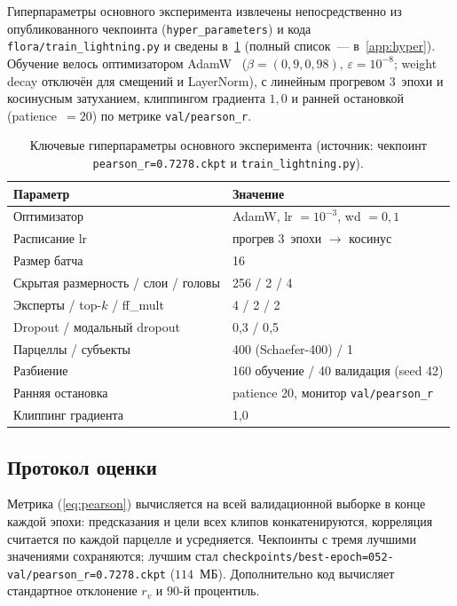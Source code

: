 \documentclass[11pt,a4paper]{article}
\begin{document}
Гиперпараметры основного эксперимента извлечены непосредственно
из опубликованного чекпоинта (\texttt{hyper\_parameters}) и кода
\texttt{flora/train\_lightning.py} и сведены в~\cref{tab:hyper}
(полный список~--- в~\cref{app:hyper}). Обучение велось
оптимизатором AdamW~\cite{Loshchilov2019} ($\beta = (0{,}9, 0{,}98)$,
$\varepsilon = 10^{-8}$; weight decay отключён для смещений и
LayerNorm), с линейным прогревом $3$~эпохи и косинусным затуханием,
клиппингом градиента $1{,}0$ и ранней остановкой (patience~$=20$)
по метрике \texttt{val/pearson\_r}.

\begin{table}[H]
\centering
\caption{Ключевые гиперпараметры основного эксперимента (источник:
чекпоинт \texttt{pearson\_r=0.7278.ckpt} и \texttt{train\_lightning.py}).}
\label{tab:hyper}
\small
\begin{tabular}{ll}
\toprule
Параметр & Значение \\
\midrule
Оптимизатор & AdamW, lr $=10^{-3}$, wd $=0{,}1$ \\
Расписание lr & прогрев 3~эпохи $\rightarrow$ косинус \\
Размер батча & 16 \\
Скрытая размерность / слои / головы & 256 / 2 / 4 \\
Эксперты / top-$k$ / ff\_mult & 4 / 2 / 2 \\
Dropout / модальный dropout & 0{,}3 / 0{,}5 \\
Парцеллы / субъекты & 400 (Schaefer-400) / 1 \\
Разбиение & 160 обучение / 40 валидация (seed 42) \\
Ранняя остановка & patience 20, монитор \texttt{val/pearson\_r} \\
Клиппинг градиента & 1{,}0 \\
\bottomrule
\end{tabular}
\end{table}

\subsection{Протокол оценки}
\label{sec:eval}

Метрика (\cref{eq:pearson}) вычисляется на всей валидационной
выборке в конце каждой эпохи: предсказания и цели всех клипов
конкатенируются, корреляция считается по каждой парцелле и
усредняется. Чекпоинты с тремя лучшими значениями сохраняются;
лучшим стал \texttt{checkpoints/best-epoch=052-val/pearson\_r=0.7278.ckpt}
($114$~МБ). Дополнительно код вычисляет стандартное отклонение
$r_v$ и $90$-й процентиль.
\end{document}
